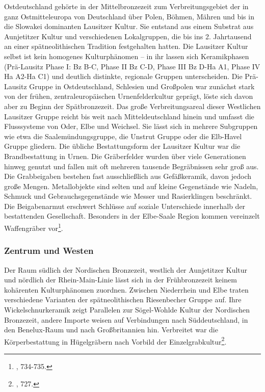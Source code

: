 \documentclass[openany,twoside,twocolumn]{book}
\let\rmarkdownfootnote\footnote%
\def\footnote{\protect\rmarkdownfootnote}
\begin{document}
Ostdeutschland gehörte in der Mittelbronzezeit zum Verbreitungsgebiet
der in ganz Ostmitteleuropa von Deutschland über Polen, Böhmen, Mähren
und bis in die Slowakei dominanten Lausitzer Kultur. Sie entstand aus
einem Substrat aus Aunjetitzer Kultur und verschiedenen Lokalgruppen,
die bis ins 2. Jahrtausend an einer spätneolithischen Tradition
festgehalten hatten. Die Lausitzer Kultur selbst ist kein homogenes
Kulturphänomen -- in ihr lassen sich Keramikphasen (Prä-Lausitz Phase I:
Bz B-C, Phase II Bz C-D, Phase III Bz D-Ha A1, Phase IV Ha A2-Ha C1) und
deutlich distinkte, regionale Gruppen unterscheiden. Die Prä-Lausitz
Gruppe in Ostdeutschland, Schlesien und Großpolen war zunächst stark von
der frühen, zentraleuropäischen Urnenfelderkultur geprägt, löste sich
davon aber zu Beginn der Spätbronzezeit. Das große Verbreitungsareal
dieser Westlichen Lausitzer Gruppe reicht bis weit nach
Mitteldeutschland hinein und umfasst die Flusssysteme von Oder, Elbe und
Weichsel. Sie lässt sich in mehrere Subgruppen wie etwa die
Saalemündungsgruppe, die Unstrut Gruppe oder die Elb-Havel Gruppe
gliedern. Die übliche Bestattungsform der Lausitzer Kultur war die
Brandbestattung in Urnen. Die Gräberfelder wurden über viele
Generationen hinweg genutzt und fallen mit oft mehreren tausende
Begräbnissen sehr groß aus. Die Grabbeigaben bestehen fast
ausschließlich aus Gefäßkeramik, davon jedoch große Mengen.
Metallobjekte sind selten und auf kleine Gegenstände wie Nadeln, Schmuck
und Gebrauchsgegenstände wie Messer und Rasierklingen beschränkt. Die
Beigabenarmut erschwert Schlüsse auf soziale Unterschiede innerhalb der
bestattenden Gesellschaft. Besonders in der Elbe-Saale Region kommen
vereinzelt Waffengräber vor\footnote{\textcite{jockenhovel_germany_2013},
  734-735.}.

\hypertarget{zentrum-und-westen}{%
\subsubsection{Zentrum und Westen}\label{zentrum-und-westen}}

Der Raum südlich der Nordischen Bronzezeit, westlich der Aunjetitzer
Kultur und nördlich der Rhein-Main-Linie lässt sich in der
Frühbronzezeit keinem kohärenten Kulturphänomen zuordnen. Zwischen
Niederrhein und Elbe traten verschiedene Varianten der spätneolithischen
Riesenbecher Gruppe auf. Ihre Wickelschnurkeramik zeigt Parallelen zur
Sögel-Wohlde Kultur der Nordischen Bronzezeit, andere Importe weisen auf
Verbindungen nach Süddeutschland, in den Benelux-Raum und nach
Großbritannien hin. Verbreitet war die Körperbestattung in Hügelgräbern
nach Vorbild der Einzelgrabkultur\footnote{\textcite{jockenhovel_germany_2013},
  727.}.
\end{document}
